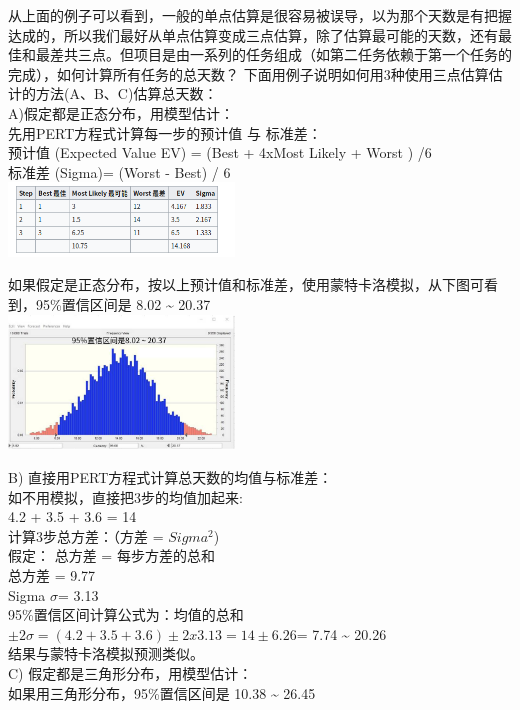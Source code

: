 从上面的例子可以看到，一般的单点估算是很容易被误导，以为那个天数是有把握达成的，所以我们最好从单点估算变成三点估算，除了估算最可能的天数，还有最佳和最差共三点。但项目是由一系列的任务组成（如第二任务依赖于第一个任务的完成），如何计算所有任务的总天数？
下面用例子说明如何用3种使用三点估算估计的方法(A、B、C)估算总天数：\\
A)假定都是正态分布，用模型估计：\\
先用PERT方程式计算每一步的预计值 与 标准差：\\
预计值 (Expected Value EV) = (Best + 4xMost Likely + Worst ) /6\\
标准差 (Sigma)= (Worst - Best) / 6\\


\includegraphics[width=6cm]{Screenshotfrom2023-11-1221-23-06.png}

如果假定是正态分布，按以上预计值和标准差，使用蒙特卡洛模拟，从下图可看到，95\%置信区间是
8.02 \textasciitilde{} 20.37\\

\includegraphics[width=6cm]{微信图片_20240117093405.jpg}

B) 直接用PERT方程式计算总天数的均值与标准差：\\
如不用模拟，直接把3步的均值加起来:\\
4.2 + 3.5 + 3.6 = 14\\
计算3步总方差：（方差 = \(Sigma^2\))\\
假定： 总方差 = 每步方差的总和\\
总方差 = 9.77\\
Sigma \(\sigma\)= 3.13\\
95\%置信区间计算公式为：均值的总和
\(\pm 2 \sigma = (4.2 + 3.5 + 3.6) \pm 2 x 3.13  = 14 \pm 6.26\)= 7.74
\textasciitilde{} 20.26\\
结果与蒙特卡洛模拟预测类似。\\
C) 假定都是三角形分布，用模型估计：\\
如果用三角形分布，95\%置信区间是 10.38 \textasciitilde{} 26.45\\

